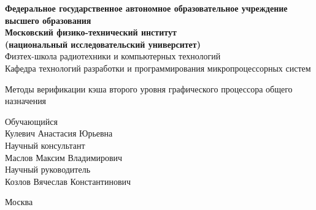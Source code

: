 \begin{titlepage}
	\begin{center}
	{\bf Федеральное государственное автономное образовательное учреждение \\
	высшего образования \\
	Московский физико-технический институт                                      \\
	(национальный исследовательский университет) \\ }
	Физтех-школа радиотехники и компьютерных технологий \\
	Кафедра технологий разработки и программирования микропроцессорных систем\\
	\vspace{1em}
	\end{center}

	\begin{center}
	\vspace{1cm}

	\vspace{\fill}

	\begin{LARGE}
	Методы верификации кэша второго уровня графического процессора общего назначения \\
	\end{LARGE}
	\vspace{1em}
	\vspace{1.5cm}
	\vspace{\fill}
	\end{center}


	\begin{flushright}
	Обучающийся\\
	Кулевич Анастасия Юрьевна\\

	\vspace{2em}
	Научный консультант \\
    Маслов Максим Владимирович\\

	\vspace{2em}
	Научный руководитель \\
	Козлов Вячеслав Константинович\\

	\end{flushright}

	\vspace{7em}

	\begin{center}
	Москва
	\the\year{}
	\end{center}
\end{titlepage}